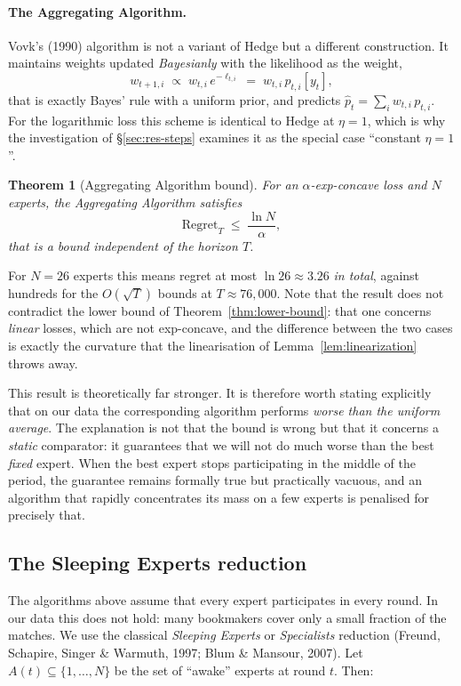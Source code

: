 \documentclass[12pt,a4paper,oneside]{report}
\renewcommand{\_}{\oldunderscore\allowbreak}
\theoremstyle{definition}
\theoremstyle{plain}
\newtheorem{theorem}{Theorem}[chapter]
\theoremstyle{remark}
\begin{document}
\paragraph{The Aggregating Algorithm.} Vovk's (1990) algorithm is not a variant of Hedge but a
different construction. It maintains weights updated \emph{Bayesianly} with the likelihood as
the weight,
\[
w_{t+1,i} \;\propto\; w_{t,i}\, e^{-\ell_{t,i}} \;=\; w_{t,i}\, p_{t,i}[y_t],
\]
that is exactly Bayes' rule with a uniform prior, and predicts
$\hat{p}_t = \sum_i w_{t,i}\,p_{t,i}$. For the logarithmic loss this scheme is identical to
Hedge at $\eta=1$, which is why the investigation of \S\ref{sec:res-steps} examines it as the
special case ``constant $\eta=1$''.

\begin{theorem}[Aggregating Algorithm bound]
\label{thm:aa}
For an $\alpha$-exp-concave loss and $N$ experts, the Aggregating Algorithm satisfies
\[
\mathrm{Regret}_T \;\leq\; \frac{\ln N}{\alpha},
\]
that is a bound \emph{independent of the horizon} $T$.
\end{theorem}

For $N=26$ experts this means regret at most $\ln 26 \approx 3.26$ \emph{in total}, against
hundreds for the $O(\sqrt{T})$ bounds at $T\approx 76{,}000$. Note that the result does not
contradict the lower bound of Theorem~\ref{thm:lower-bound}: that one concerns \emph{linear}
losses, which are not exp-concave, and the difference between the two cases is exactly the
curvature that the linearisation of Lemma~\ref{lem:linearization} throws away.

This result is theoretically far stronger. It is therefore worth stating explicitly that on our
data the corresponding algorithm performs \emph{worse than the uniform average}. The
explanation is not that the bound is wrong but that it concerns a \emph{static} comparator: it
guarantees that we will not do much worse than the best \emph{fixed} expert. When the best
expert stops participating in the middle of the period, the guarantee remains formally true but
practically vacuous, and an algorithm that rapidly concentrates its mass on a few experts is
penalised for precisely that.

\subsection{The Sleeping Experts reduction}
\label{sec:sleeping}

The algorithms above assume that every expert participates in every round. In our data this
does not hold: many bookmakers cover only a small fraction of the matches. We use the classical
\emph{Sleeping Experts} or \emph{Specialists} reduction (Freund, Schapire, Singer \& Warmuth,
1997; Blum \& Mansour, 2007). Let $A(t) \subseteq \{1,\dots,N\}$ be the set of ``awake''
experts at round $t$. Then:
\end{document}
